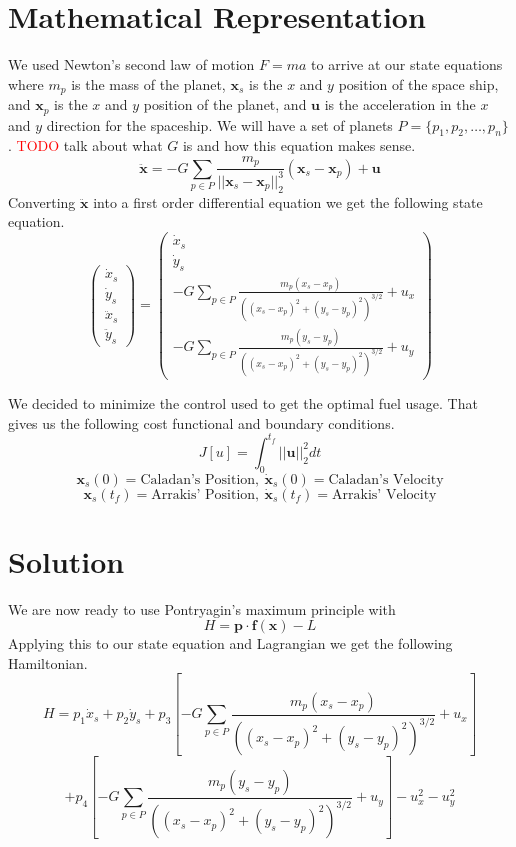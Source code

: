 \documentclass[11pt]{amsart}
\begin{document}
\section{Mathematical Representation}
We used Newton's second law of motion $F=ma$ to arrive at our state equations where $m_p$ is the mass of the planet, $\mathbf{x}_s$ is the $x$ and $y$ position of the space ship, and $\mathbf{x}_p$ is the $x$
and $y$ position of the planet, and $\mathbf{u}$ is the acceleration in the $x$ and $y$ direction for the spaceship. We will have a set of planets $P = \{p_1, p_2,\dots,p_n\}$. \textcolor{red}{TODO} talk about what $G$ is and how this equation makes sense.
\[\ddot{\mathbf{x}} = -G\sum_{p\in{P}}^{}\frac{m_p}{||\mathbf{x}_s-\mathbf{x}_p||_2^3}(\mathbf{x}_s-\mathbf{x}_p) + \mathbf{u}\]
Converting $\ddot{\mathbf{x}}$ into a first order differential equation we get the following state equation. 
\[\begin{pmatrix}
    \dot{x}_s \\
    \dot{y}_s \\
    \ddot{x}_s\\
    \ddot{y}_s 
\end{pmatrix} = \begin{pmatrix}
    \dot{x}_s \\
    \dot{y}_s \\
    -G\sum_{p\in{P}}^{}\frac{m_p(x_s - x_p)}{((x_s-x_p)^2+(y_s-y_p)^2)^{3/2}} + u_x \\
    -G\sum_{p\in{P}}^{}\frac{m_p(y_s - y_p)}{((x_s-x_p)^2+(y_s-y_p)^2)^{3/2}} + u_y
\end{pmatrix}\]

We decided to minimize the control used to get the optimal fuel usage. That gives us the following cost functional and boundary conditions. 
\[J[u] = \int_{0}^{t_f}||\mathbf{u}||_2^2dt\]
\[\mathbf{x}_s(0) = \text{Caladan's Position},\: \dot{\mathbf{x}}_s(0) = \text{Caladan's Velocity}\]
\[\mathbf{x}_s(t_f) = \text{Arrakis' Position},\: \dot{\mathbf{x}}_s(t_f) = \text{Arrakis' Velocity}\]

\section{Solution}
We are now ready to use Pontryagin's maximum principle with 
\[H = \mathbf{p}\cdot\mathbf{f(\mathbf{x})} - L\]
Applying this to our state equation and Lagrangian we get the following Hamiltonian.
\[H = p_1\dot{x}_s + p_2\dot{y}_s + p_3\left[-G\sum_{p\in{P}}^{}\frac{m_p(x_s - x_p)}{((x_s-x_p)^2+(y_s-y_p)^2)^{3/2}} + u_x\right]\]
\[+ p_4\left[-G\sum_{p\in{P}}^{}\frac{m_p(y_s - y_p)}{((x_s-x_p)^2+(y_s-y_p)^2)^{3/2}} + u_y\right] - u_x^2 - u_y^2\]
\end{document}
